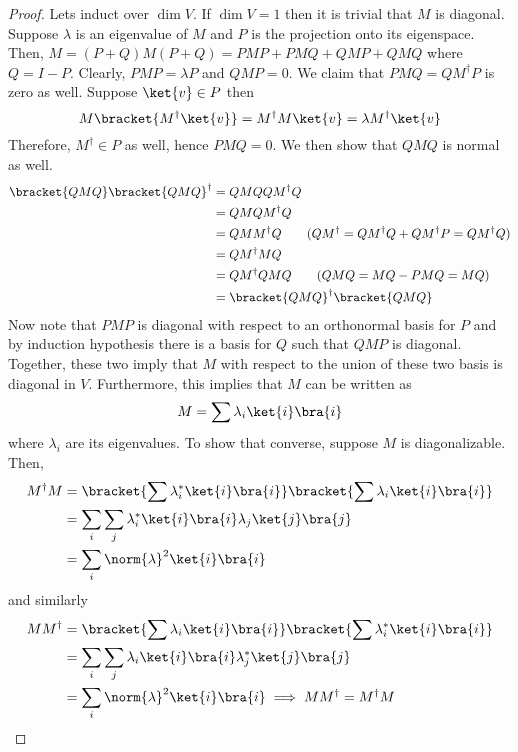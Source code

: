 \begin{proof}
    Lets induct over \(\dim V\). If \(\dim V = 1\) then it is trivial that \(M\) is diagonal. Suppose \(\lambda\) is an eigenvalue of \(M\) and \(P\) is the projection onto its eigenspace. Then, \(M = (P + Q) M (P + Q) = PMP + PMQ + QMP + QMQ\) where \(Q = I - P\). Clearly, \(PMP = \lambda P\) and \(QMP = 0\). We claim that \(PMQ = QM^{\dagger} P \) is zero as well. Suppose \(\ket{v} \in P\) then 
    \begin{equation*}
        M \bracket{M^{\dagger} \ket{v}} = M^{\dagger} M \ket{v} = \lambda M^{\dagger} \ket{v}
    \end{equation*}
    Therefore, \(M^{\dagger} \in P\) as well, hence \(PMQ = 0\). We then show that \(QMQ\) is normal as well. 
    \begin{align*}
        \bracket{QMQ} \bracket{QMQ}^{\dagger} &= QMQQM^{\dagger}Q\\
        &= Q M Q M^{\dagger} Q \\
        &= QM M^{\dagger} Q \qquad (QM^{\dagger} = QM^{\dagger} Q + QM^{\dagger} P = QM^{\dagger}Q)\\
        &= QM^{\dagger} M Q \\
        &= QM^{\dagger} QMQ  \qquad (QMQ = MQ - PMQ = MQ)\\
        &= \bracket{QMQ}^{\dagger} \bracket{QMQ}
    \end{align*}
    Now note that \(PMP\) is diagonal with respect to an orthonormal basis for \(P\) and by induction hypothesis there is a basis for \(Q\) such that \(QMP\) is diagonal. Together, these two imply that \(M\) with respect to the union of these two basis is diagonal in \(V\). Furthermore, this implies that \(M\) can be written as 
    \begin{equation*}
        M = \sum \lambda_i \ket{i} \bra{i}
    \end{equation*}
    where \(\lambda_i\) are its eigenvalues. To show that converse, suppose \(M\) is diagonalizable. Then,
    \begin{align*}
        M^{\dagger} M &=\bracket{\sum \lambda_i^{\ast} \ket{i} \bra{i}} \bracket{\sum \lambda_i\ket{i} \bra{i}}\\
        &= \sum_i \sum_j \lambda_i^{\ast} \ket{i} \bra{i}  \lambda_j\ket{j} \bra{j}\\
        &= \sum_i \norm{\lambda}^2 \ket{i} \bra{i}
    \end{align*} 
    and similarly 
    \begin{align*}
        M M^{\dagger}  &=  \bracket{\sum \lambda_i\ket{i} \bra{i}} \bracket{\sum \lambda_i^{\ast} \ket{i} \bra{i}}\\
        &= \sum_i \sum_j \lambda_i \ket{i} \bra{i}  \lambda_j^{\ast} \ket{j} \bra{j}\\
        &= \sum_i \norm{\lambda}^2 \ket{i} \bra{i} \implies M M^{\dagger} = M^{\dagger} M
    \end{align*}
\end{proof}

